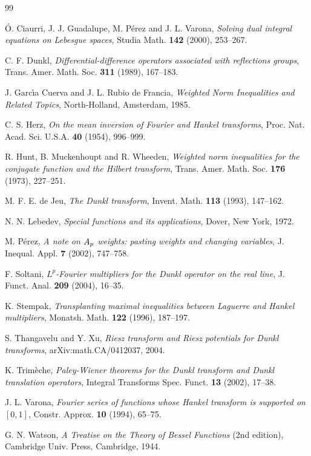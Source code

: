 \documentclass[a4paper]{amsart}
\theoremstyle{plain}
\theoremstyle{remark}
\begin{document}

\begin{thebibliography}{99}

 \'O. Ciaurri, J. J. Guadalupe, M. P\'erez and J. L. Varona,
\textit{Solving dual integral equations on Lebesgue spaces},
{Studia Math.}
\textbf{142} (2000), 253--267.

 C. F. Dunkl,
\textit{Differential-difference operators associated with reflections groups},
{Trans. Amer. Math. Soc.}
\textbf{311} (1989), 167--183.

 J. Garc\'{\i}a Cuerva and J. L. Rubio de Francia,
\textit{Weighted Norm Inequalities and Related Topics},
North-Holland, Amsterdam, 1985.

 C. S. Herz,
\textit{On the mean inversion of Fourier and Hankel transforms},
{Proc. Nat. Acad. Sci. U.S.A.}
\textbf{40} (1954), 996--999.

 R. Hunt, B. Muckenhoupt and R. Wheeden,
\textit{Weighted norm inequalities for the conjugate function and the Hilbert transform},
{Trans. Amer. Math. Soc.}
\textbf{176} (1973), 227--251.

 M. F. E. de Jeu,
\textit{The Dunkl transform},
{Invent. Math.}
\textbf{113} (1993), 147--162.

 N. N. Lebedev,
\textit{Special functions and its applications},
Dover, New York, 1972.

 M. P\'erez,
\textit{A note on $A\sb p$ weights: pasting weights and changing variables},
{J. Inequal. Appl.}
\textbf{7} (2002), 747--758.

 F. Soltani,
\textit{$L^p$-Fourier multipliers for the Dunkl operator on the real line},
{J. Funct. Anal.}
\textbf{209} (2004), 16--35.

 K. Stempak,
\textit{Transplanting maximal inequalities between Laguerre and Hankel multipliers},
{Monatsh. Math.}
\textbf{122} (1996), 187--197.

 S. Thangavelu and Y. Xu,
\textit{Riesz transform and Riesz potentials for Dunkl transforms},
arXiv:math.CA/0412037, 2004.

 K. Trim\`eche,
\textit{Paley-Wiener theorems for the Dunkl transform and Dunkl translation operators},
{Integral Transforms Spec. Funct.}
\textbf{13} (2002), 17--38.

 J. L. Varona,
\textit{Fourier series of functions whose Hankel transform is supported on $[0,1]$},
{Constr. Approx.}
\textbf{10} (1994), 65--75.

 G. N. Watson,
\textit{A Treatise on the Theory of Bessel Functions} (2nd edition),
Cambridge Univ. Press,
Cambridge, 1944.

\end{thebibliography}
\end{document}
